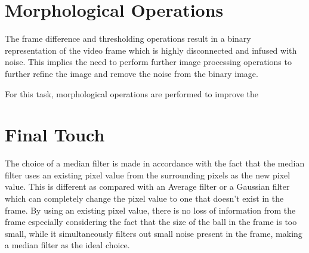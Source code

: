 \documentclass[a4paper]{article}
\begin{document}
\section{Morphological Operations}
The frame difference and thresholding operations result in a binary representation of the video frame which is highly disconnected and infused with noise. This implies the need to perform further image processing operations to further refine the image and remove the noise from the binary image.\par

For this task, morphological operations are performed to improve the 
\newpage
\section{Final Touch}
The choice of a median filter is made in accordance with the fact that the median filter uses an existing pixel value from the surrounding pixels as the new pixel value. This is different as compared with an Average filter or a Gaussian filter which can completely change the pixel value to one that doesn't exist in the frame. By using an existing pixel value, there is no loss of information from the frame especially considering the fact that the size of the ball in the frame is too small, while it simultaneously filters out small noise present in the frame, making a median filter as the ideal choice.\par
\newpage
\newpage


\end{document}
